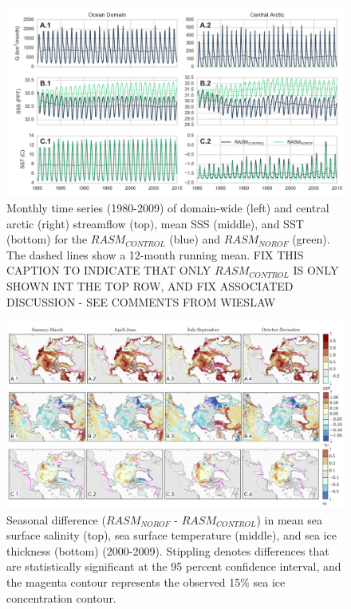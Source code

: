 \documentclass[jgrga, draft]{agutex}
\begin{document}
\clearpage
\begin{figure}
\noindent\includegraphics[width=40pc,natwidth=1]{ocean_combine_ts}
\caption{Monthly time series (1980-2009) of domain-wide (left) and central arctic (right) streamflow (top), mean SSS (middle), and SST (bottom) for the $RASM_{CONTROL}$ (blue) and $RASM_{NOROF}$ (green). The dashed lines show a 12-month running mean. FIX THIS CAPTION TO INDICATE THAT ONLY $RASM_{CONTROL}$ IS ONLY SHOWN INT THE TOP ROW, AND FIX ASSOCIATED DISCUSSION - SEE COMMENTS FROM WIESLAW
}
\label{fig:ocean_timeseries}
\end{figure}

\clearpage
\begin{figure}
\noindent\includegraphics[width=40pc,natwidth=1]{ocean_combine}
\caption{Seasonal difference ($RASM_{NOROF}$ - $RASM_{CONTROL}$) in mean sea surface salinity (top), sea surface temperature (middle), and sea ice thickness (bottom) (2000-2009). Stippling denotes differences that are statistically significant at the 95 percent confidence interval, and the magenta contour represents the observed 15\% sea ice concentration contour. }
\label{fig:ocean_maps}
\end{figure}
\end{document}
